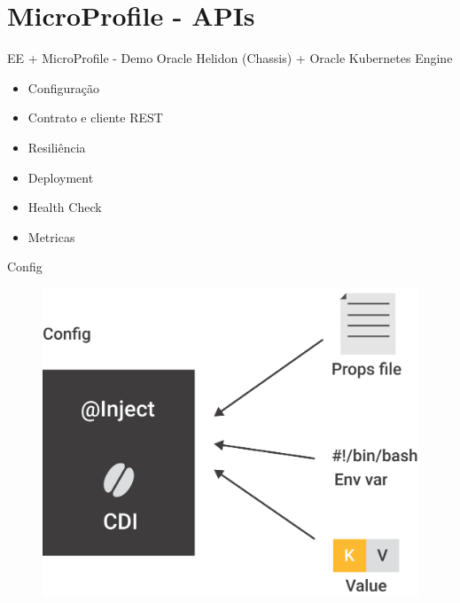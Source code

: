 \documentclass[aspectratio=169]{beamer}
\begin{document}
{
    \section{MicroProfile - APIs}
}

\begin{frame}{EE + MicroProfile  - Demo}
Oracle Helidon (Chassis) +  Oracle Kubernetes Engine

\begin{itemize}
	\item Configuração
	\item Contrato e cliente REST
	\item Resiliência
	\item Deployment
	\item Health Check
    \item Metricas
\end{itemize}

\end{frame}

\begin{frame}{Config}
\begin{figure}
	\centering
	\includegraphics[width=0.65\linewidth]{Images/config}
\end{figure}
\end{frame}
\end{document}
